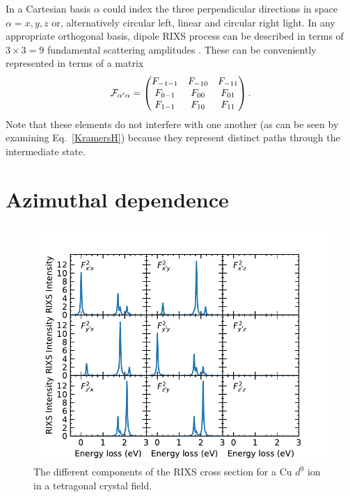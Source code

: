 \documentclass[aps,onecolumn, notitlepage, longbibliography]{revtex4-1}
\begin{document}
In a Cartesian basis $\alpha$ could index the three perpendicular directions in space $\alpha=x,y,z$ or, alternatively circular left, linear and circular right light. In any appropriate orthogonal basis, dipole RIXS process can be described in terms of $3\times3=9$ fundamental scattering amplitudes \cite{Ament2011}. These can be conveniently represented in terms of a matrix 
\begin{equation}
 {\cal F}_{\alpha^\prime\alpha} =
  \begin{pmatrix}
    F_{-1-1} & F_{-10}  & F_{-11}  \\
    F_{0-1} & F_{00}  & F_{01}  \\
   F_{1-1} & F_{10}  & F_{11}
  \end{pmatrix} .
\end{equation}
Note that these elements do not interfere with one another (as can be seen by examining Eq.~\ref{KramersH}) because they represent distinct paths through the intermediate state.

\section{Azimuthal dependence}
\begin{figure}
    \includegraphics{Cu_RIXS.pdf}
    \caption{The different components of the RIXS cross section for a Cu $d^9$ ion in a tetragonal crystal field.}
    \label{Cu_RIXS_spectra}
\end{figure}
\end{document}
